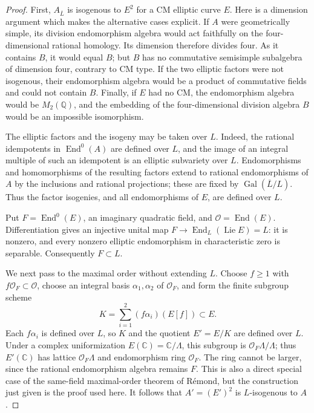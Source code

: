 \begin{proof}
First, $A_{\overline L}$ is isogenous to $E^2$ for a CM elliptic curve
$E$. Here is a dimension argument which makes the alternative cases
explicit. If $A$ were geometrically simple, its division endomorphism
algebra would act faithfully on the four-dimensional rational homology.
Its dimension therefore divides four. As it contains $B$, it would equal
$B$; but $B$ has no commutative semisimple subalgebra of dimension four,
contrary to CM type. If the two elliptic factors were not isogenous,
their endomorphism algebra would be a product of commutative fields and
could not contain $B$. Finally, if $E$ had no CM, the endomorphism algebra
would be $M_2(\mathbb Q)$, and the embedding of the four-dimensional
division algebra $B$ would be an impossible isomorphism.

The elliptic factors and the isogeny may be taken over $L$. Indeed,
the rational idempotents in $\operatorname{End}^0(A)$ are defined over
$L$, and the image of an integral multiple of such an idempotent is an
elliptic subvariety over $L$. Endomorphisms and homomorphisms of the
resulting factors extend to rational endomorphisms of $A$ by the
inclusions and rational projections; these are fixed by
$\operatorname{Gal}(\overline L/L)$. Thus the factor isogenies, and all
endomorphisms of $E$, are defined over $L$.

Put $F=\operatorname{End}^0(E)$, an imaginary quadratic field, and
$\mathcal O=\operatorname{End}(E)$. Differentiation gives an injective
unital map $F\longrightarrow\operatorname{End}_L(\operatorname{Lie}E)=L$:
it is nonzero, and every nonzero elliptic endomorphism in characteristic
zero is separable. Consequently $F\subset L$.

We next pass to the maximal order without extending $L$. Choose
$f\ge1$ with $f\mathcal O_F\subset\mathcal O$, choose an integral
basis $\alpha_1,\alpha_2$ of $\mathcal O_F$, and form the finite
subgroup scheme
\[
 K=\sum_{i=1}^2(f\alpha_i)(E[f])\subset E.
\]
Each $f\alpha_i$ is defined over $L$, so $K$ and the quotient
$E'=E/K$ are defined over $L$. Under a complex uniformization
$E(\mathbb C)=\mathbb C/\Lambda$, this subgroup is
$\mathcal O_F\Lambda/\Lambda$; thus $E'(\mathbb C)$ has lattice
$\mathcal O_F\Lambda$ and endomorphism ring $\mathcal O_F$.
The ring cannot be larger, since the rational endomorphism algebra
remains $F$. This is also a direct special case of the same-field
maximal-order theorem of R\'emond, but the construction just given is
the proof used here. It follows that $A'=(E')^2$ is $L$-isogenous to $A$.


\end{proof}
